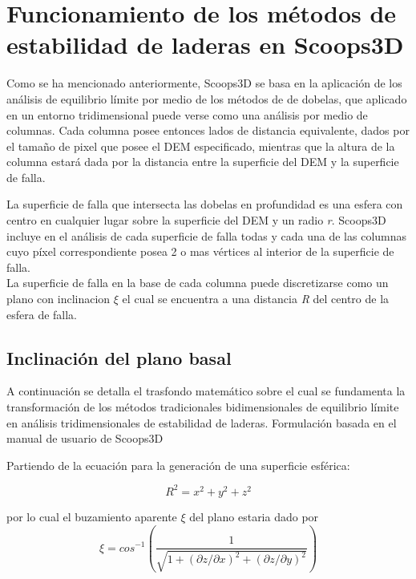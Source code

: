 \section{Funcionamiento de los m\'etodos de estabilidad de laderas en Scoops3D}



Como se ha mencionado anteriormente, Scoops3D se basa en la aplicaci\'on de los an\'alisis de equilibrio l\'imite por medio de los m\'etodos de de dobelas, que aplicado en un entorno tridimensional puede verse como una an\'alisis por medio de columnas.
Cada columna posee entonces lados de distancia equivalente, dados por el tama\~no de pixel que posee el DEM especificado, mientras que la altura de la columna estar\'a dada por la distancia entre la superficie del DEM y la superficie de falla.\cite{chen1981three}

La superficie de falla que intersecta las dobelas en profundidad es una esfera con centro en cualquier lugar sobre la superficie del DEM y un radio \textit{r}. Scoops3D incluye en el an\'alisis de cada superficie de falla todas y cada una de las columnas cuyo p\'ixel correspondiente posea 2 o mas v\'ertices al interior de la superficie de falla.\\

La superficie de falla en la base de cada columna puede discretizarse como un plano con inclinacion $ \xi$ el cual se encuentra a una distancia \textit{R} del centro de la esfera de falla. \cite{chen1981three}


\subsection{Inclinaci\'on del plano basal}

A continuaci\'on se detalla el trasfondo matem\'atico sobre el cual se fundamenta la transformaci\'on de los m\'etodos tradicionales bidimensionales de equilibrio l\'imite en an\'alisis  tridimensionales de estabilidad de laderas. 
Formulaci\'on basada en el manual de usuario de Scoops3D \cite{formulas}


Partiendo de la ecuaci\'on para la generaci\'on de una superficie esf\'erica:

$$ \textit{R}^{2} = \textit{x}^{2} + \textit{y}^{2} + \textit{z}^{2}$$

por lo cual el buzamiento aparente $\xi$ del plano estaria dado por
$$ \xi = \textit{cos}^{-1}  (\dfrac{1}{\sqrt{1+(\partial z/ \partial x)^{2} + (\partial z/ \partial y)^{2} }})   $$

